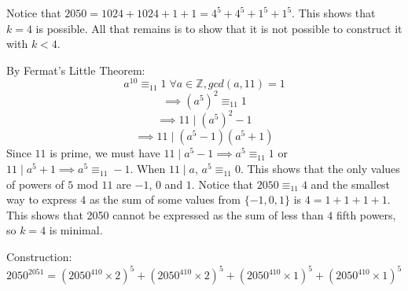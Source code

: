 \documentclass{article}
\begin{document}
\begin{enumerate}[1.]
Notice that $2050 = 1024 + 1024 + 1 + 1 = 4^5 + 4^5 + 1^5 + 1^5$. This shows that $k = 4$ is possible. All that remains is to show that it is not possible to construct it with $k < 4$.

By Fermat's Little Theorem: 
$$a^{10} \equiv _{11} 1 \; \forall a \in \mathbb{Z}, gcd(a, 11) = 1$$ 
$$\implies (a^5)^2 \equiv _{11} 1$$
$$\implies 11 \; | \; (a^5)^2 - 1$$
$$\implies 11 \; | \; (a^5 - 1)(a^5 + 1)$$
Since $11$ is prime, we must have $11 \; | \; a^5 - 1 \implies a^5 \equiv _{11} 1$ or $11 \; | \; a^5 + 1 \implies a^5 \equiv _{11} -1$. When $11 \; | \; a$, $a^5 \equiv _{11} 0$.
This shows that the only values of powers of $5$ mod $11$ are $-1$, $0$ and $1$. Notice that $2050 \equiv _{11} 4$ and the smallest way to express $4$ as the sum of some values from $\{-1, 0, 1\}$ is $4 = 1 + 1 + 1 + 1$.
This shows that 2050 cannot be expressed as the sum of less than $4$ fifth powers, so $k = 4$ is minimal.

Construction: $2050^{2051} = (2050^{410} \times 2)^5 + (2050^{410} \times 2)^5 + (2050^{410} \times 1)^5 + (2050^{410} \times 1)^5$

\end{enumerate}
\end{document}
